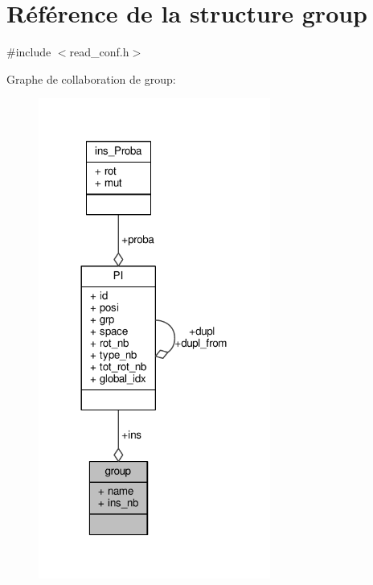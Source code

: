 \hypertarget{structgroup}{\section{Référence de la structure group}
\label{structgroup}
}


{\ttfamily \#include $<$read\+\_\+conf.\+h$>$}



Graphe de collaboration de group\+:\nopagebreak
\begin{figure}[H]
\begin{center}
\leavevmode
\includegraphics[width=216pt]{structgroup__coll__graph}
\end{center}
\end{figure}
